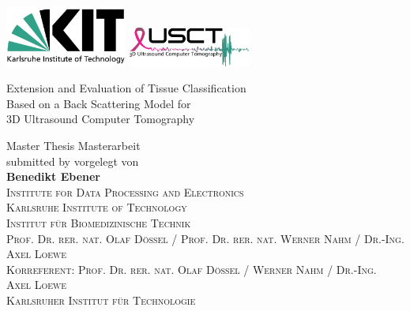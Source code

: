 \begin{titlingpage}
    \linespread{1.2}
\parindent0cm

\raggedright{ \includegraphics[width=4cm]{Graphics/KITlogo.pdf} \hfill \includegraphics[width=4cm]{Graphics/USCT crowdfunding logo_frutiger_FINAL.png} }

   \vspace{3cm}


\begin{minipage}[c]{15.5cm}
\begin{center}
   \begin{huge}
   \hspace{-1cm}
     Extension and Evaluation of Tissue Classification\\
   \hspace{-1cm}
     Based on a Back Scattering Model for\\
   \hspace{-1cm}
      3D Ultrasound Computer Tomography\\
   \end{huge}
\end{center}
\end{minipage}
\vfill
\begin{minipage}[c]{15.5cm}
   \begin{center}

    {\Large
     \ifenglish
     Master Thesis
 	\else
    Masterarbeit
	\fi
	}\\

    \vspace{0.5cm}
     {\large
      \ifenglish
        submitted by
      \else
        vorgelegt von
      \fi
      }\\
    \vspace{0.5cm}
     \textbf{\Large Benedikt Ebener}
   \vspace{4cm} \\


 \textsc{
 \ifenglish
   Institute for Data Processing and Electronics\\
   Karlsruhe Institute of Technology\\
 \else
    Institut f\"ur Biomedizinische Technik\\
    Prof. Dr. rer. nat. Olaf D\"ossel / Prof. Dr. rer. nat. Werner Nahm / Dr.-Ing. Axel Loewe\\
    Korreferent: Prof. Dr. rer. nat. Olaf D\"ossel / Werner Nahm / Dr.-Ing. Axel Loewe\\
    Karlsruher Institut f\"ur Technologie\\
 \fi
 }


\end{center}
\end{minipage}
\end{titlingpage}
